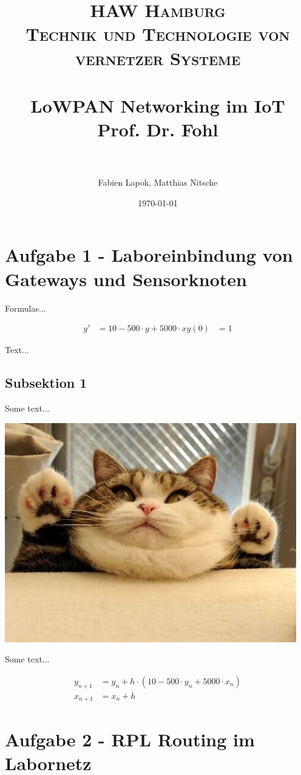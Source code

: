 \documentclass[paper=a4, fontsize=11pt]{scrartcl} %
\title {
  \normalfont \normalsize
  \textsc{HAW Hamburg} \\ [25pt] %
  \textsc{Technik und Technologie von vernetzer Systeme} \\ [15pt]
  \horrule{0.5pt} \\[0.4cm] %
  \huge LoWPAN Networking im IoT \\ [15pt] %
  \small Prof. Dr. Fohl \\
  \horrule{2pt} \\[0.5cm] %
}
\author{Fabien Lapok, Matthias Nitsche}
\date{\normalsize\today}
\numberwithin{equation}{section} %
\numberwithin{figure}{section} %
\numberwithin{table}{section} %
\begin{document}
\maketitle

\section{Aufgabe 1 - Laboreinbindung von Gateways und Sensorknoten}

Formulas...

\begin{align}
  y' &= 10 - 500 \cdot y + 5000 \cdot x
  y(0) &= 1
\end{align}

Text...

\subsection{Subsektion 1}

Some text...

\includegraphics[width=\linewidth]{imgs/cat.jpg}

Some text...

\begin{align}
  y_{n+1} &=  y_n + h \cdot (10 - 500 \cdot y_n + 5000 \cdot x_n) \\
  x_{n+1} &= x_n + h
\end{align}

\section{Aufgabe 2 - RPL Routing im Labornetz}
\end{document}
